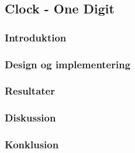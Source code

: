 {
    \newcommand{\labelprefix}{src6-2}

\subsection{Clock - One Digit}

\subsubsection{Introduktion}

\subsubsection{Design og implementering}

\subsubsection{Resultater}


\subsubsection{Diskussion}

\subsubsection{Konklusion}
   
}